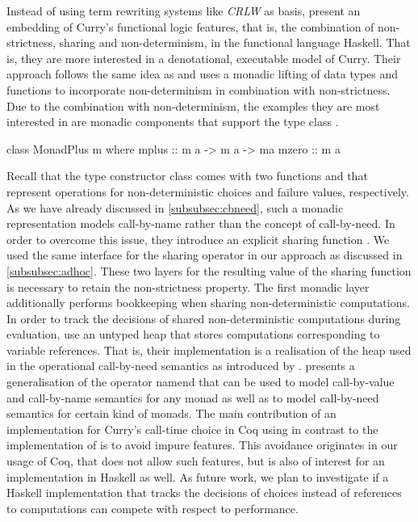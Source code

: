 Instead of using term rewriting systems like \emph{CRLW} as basis, \citet{fischer2009purely} present an embedding of Curry's functional logic features, that is, the combination of non\--strictness, sharing and non\--determinism, in the functional language Haskell.
That is, they are more interested in a denotational, executable model of Curry.
Their approach follows the same idea as \citet{abel2005verifying} and uses a monadic lifting of data types and functions to incorporate non\--determinism in combination with non\--strictness.
Due to the combination with non\--determinism, the examples they are most interested in are monadic components that support the type class .

\begin{haskellcode}
class MonadPlus m where
  mplus :: m a -> m a -> ma
  mzero :: m a
\end{haskellcode}

Recall that the type constructor class  comes with two functions  and  that represent operations for non\--deterministic choices and failure values, respectively.
As we have already discussed in \autoref{subsubsec:cbneed}, such a monadic representation models call\--by\--name rather than the concept of call\--by\--need.
In order to overcome this issue, they introduce an explicit sharing function .
We used the same interface for the sharing operator in our approach as discussed in \autoref{subsubsec:adhoc}.
These two layers for the resulting value of the sharing function is necessary to retain the non\--strictness property.
The first monadic layer additionally performs bookkeeping when sharing non\--deterministic computations.
In order to track the decisions of shared non\--deterministic computations during evaluation, \citeauthor{fischer2009purely} use an untyped heap that stores computations corresponding to variable references.
That is, their implementation is a realisation of the heap used in the operational call\--by\--need semantics as introduced by \citet{launchbury1993natural}.
\citet{petricek2012evaluation} presents a generalisation of the  operator namend  that can be used to model call-by-value and call-by-name semantics for any monad  as well as to model call-by-need semantics for certain kind of monads.
The main contribution of an implementation for Curry's call\--time choice in Coq using  in contrast to the implementation of \citeauthor{fischer2009purely} is to avoid impure features.
This avoidance originates in our usage of Coq, that does not allow such features, but is also of interest for an implementation in Haskell as well.
As future work, we plan to investigate if a Haskell implementation that tracks the decisions of choices instead of references to computations can compete with respect to performance.

